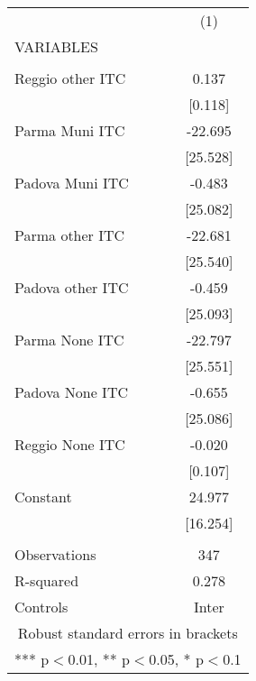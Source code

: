 \begin{tabular}{lc} \hline
 & (1) \\
VARIABLES &  \\ \hline
 &  \\
Reggio other ITC & 0.137 \\
 & [0.118] \\
Parma Muni ITC & -22.695 \\
 & [25.528] \\
Padova Muni ITC & -0.483 \\
 & [25.082] \\
Parma other ITC & -22.681 \\
 & [25.540] \\
Padova other ITC & -0.459 \\
 & [25.093] \\
Parma None ITC & -22.797 \\
 & [25.551] \\
Padova None ITC & -0.655 \\
 & [25.086] \\
Reggio None ITC & -0.020 \\
 & [0.107] \\
Constant & 24.977 \\
 & [16.254] \\
 &  \\
Observations & 347 \\
R-squared & 0.278 \\
 Controls & Inter \\ \hline
\multicolumn{2}{c}{ Robust standard errors in brackets} \\
\multicolumn{2}{c}{ *** p$<$0.01, ** p$<$0.05, * p$<$0.1} \\
\end{tabular}
